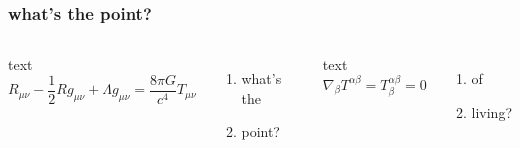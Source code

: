 \documentclass[xcolor=dvipsnames]{beamer}
\begin{document}
    \begin{frame}
        \frametitle{what's the point?} 
        \begin{columns}
            text
            \[
            R_{\mu \nu}-\frac{1}{2}R g_{\mu\nu}+\Lambda g_{\mu\nu}=\frac{8 \pi G}{c^4}T_{\mu\nu}
            \] 
            \begin{enumerate}
                \item what's the
                \item point?
            \end{enumerate}
            text
            \[
            \nabla _{\beta }T^{\alpha \beta }=T^{\alpha \beta }_{\beta }=0
            \] 
            \begin{enumerate}
                \item of
                \item living?
            \end{enumerate}
        \end{columns}
    \end{frame}
\end{document}
